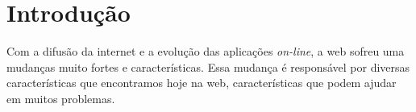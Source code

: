 \documentclass[
	12pt,				%
	openright,			%
	twoside,			%
	a4paper,			%
	Times,
	brazil,				%
	]{abntex2}
\begin{document}



\tableofcontents*
\cleardoublepage


\textual

\chapter*[Introdução]{Introdução}
\par
Com a difusão da internet e a evolução das aplicações  \textit{on-line}, a web sofreu uma mudanças muito fortes e características. Essa mudança é responsável por diversas características que encontramos hoje na web, características que podem ajudar em muitos problemas.
\par
\end{document}
